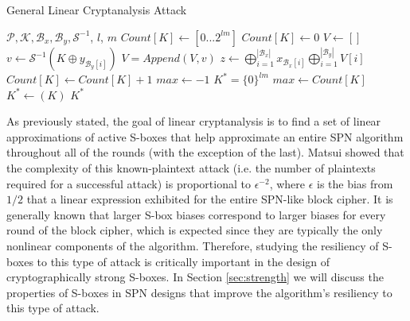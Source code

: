 \begin{algorithm}[t!] %
\caption{General Linear Cryptanalysis Attack} \label{alg:linearAttack}
\begin{algorithmic}[1]
\Require $\mathcal{P}, \mathcal{K}, \mathcal{B}_x, \mathcal{B}_y, \mathcal{S}^{-1}$, $l$, $m$
\State $Count[K] \gets [0...2^{lm}]$
	\State $Count[K] \gets 0$
\EndFor
{}
		\State $V \gets []$
			\State $v \gets \mathcal{S}^{-1}(K \oplus y_{\mathcal{B}_{y}[i]})$
			\State $V = Append(V, v)$
		\EndFor
		\State $z \gets \bigoplus_{i = 1}^{|\mathcal{B}_x|} x_{\mathcal{B}_{x}[i]} \bigoplus_{i=1}^{|\mathcal{B}_y|} V[i]$ 
			\State $Count[K] \gets Count[K] + 1$
		\EndIf
	\EndFor
\EndFor
\State $max \gets -1$
\State $K^* = \{0\}^{lm}$
		\State $max \gets Count[K]$
		\State $K^* \gets (K)$
	\EndIf
\EndFor
\State \Return $K^*$
\end{algorithmic}
\end{algorithm}

As previously stated, the goal of linear cryptanalysis is to find a set of linear approximations of active S-boxes that help approximate an entire SPN algorithm throughout all of the rounds (with the exception of the last). Matsui \cite{Matsui91-1} showed that the complexity of this known-plaintext attack (i.e. the number of plaintexts required for a successful attack) is proportional to $\epsilon^{-2}$, where $\epsilon$ is the bias from $1/2$ that a linear expression exhibited for the entire SPN-like block cipher. It is generally known that larger S-box biases correspond to larger biases for every round of the block cipher, which is expected since they are typically the only nonlinear components of the algorithm. Therefore, studying the resiliency of S-boxes to this type of attack is critically important in the design of cryptographically strong S-boxes. In Section \ref{sec:strength} we will discuss the properties of S-boxes in SPN designs that improve the algorithm's resiliency to this type of attack.

